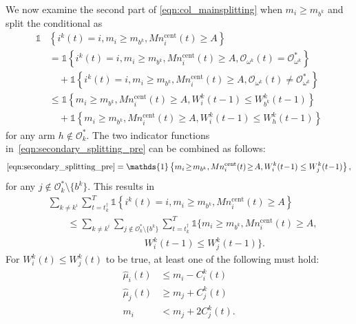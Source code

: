 \documentclass[final,5p,times,twocolumn]{elsarticle}
\theoremstyle{definition}
\begin{document}
	
	We now examine the second part of \eqref{eqn:col_mainsplitting} when $m_i \geq m_{b^k}$ and split the conditional as
	\begin{align}
		\mathds{1} &\left\{ i^k(t) \! = \! i, m_i \! \geq \! m_{b^k}, Mn_i^{\text{cent}}(t) \geq A \right\} \nonumber \\
		& = \mathds{1} \left\{ i^k(t) \! = \! i, m_i \! \geq \! m_{b^k}, Mn_i^{\text{cent}}(t) \! \geq \! A , \mathcal{O}_{\omega^k}(t) = \mathcal{O}_{\omega^k}^* \right\} \nonumber \\
		&\quad + \mathds{1} \left\{ i^k(t) \! = \! i, m_i \! \geq \! m_{b^k}, Mn_i^{\text{cent}}(t) \! \geq \! A , \mathcal{O}_{\omega^k}(t) \neq \mathcal{O}_{\omega^k}^* \right \} \nonumber \\
		&\leq \mathds{1} \left\{ m_i \! \geq \! m_{b^k}, Mn_i^{\text{cent}}(t) \! \geq \! A ,  W_i^k(t \! - \! 1) \leq W_{b^k}^k(t \! - \! 1) \right \} \nonumber \\
		&\quad + \mathds{1} \left\{ m_i \! \geq \! m_{b^k}, Mn_i^{\text{cent}}(t) \! \geq \! A , W_i^k(t \! - \! 1) \leq W_{h}^k(t \! - \! 1) \right \} \label{eqn:secondary_splitting_pre}
	\end{align}
	for any arm $h\notin \mathcal{O}_{k}^*$. The two indicator functions in~\eqref{eqn:secondary_splitting_pre} can be combined as follows:
		\begin{equation*}	
		\eqref{eqn:secondary_splitting_pre} = \mathds{1} \left\{ m_i \! \geq \! m_{b^k}, Mn_i^{\text{cent}}(t) \! \geq \! A , W_i^k(t \! - \! 1) \leq W_{j}^k(t \! - \! 1) \right \},
	\end{equation*}
	for any $j\notin \mathcal{O}_{k}^* \setminus \{b^k\}$.
%
	This results in 
%
	\begin{align}
		& \sum_{k \neq k^i} \sum_{t=t_k^\dag}^{T} \mathds{1} \left\{ i^k(t) = i, m_i \geq m_{b^k}, Mn_i^{\text{cent}}(t) \geq A \right\} \nonumber \\
		& \qquad \leq \sum_{k \neq k^i} \sum_{j\notin  \mathcal{O}_{k}^* \setminus \{ b^k\}} \sum_{t=t_k^\dag}^{T} \mathds{1} \big\{ m_i \! \geq \! m_{b^k}, Mn_i^{\text{cent}}(t) \! \geq \! A , \nonumber \\
		& \qquad \qquad \qquad \qquad \qquad   W_i^k(t \! - \! 1) \leq W_{j}^k(t \! - \! 1) \big \}. \label{eqn:Collisions_Selections_P2}
	\end{align}
%	
	 For $W_i^k(t) \leq W_{j}^k(t) $ to be true, at least one of the following must hold:
	\begin{align}
		\hat{\mu}_{i}(t) &\leq m_{i} - C_{i}^k(t) \label{1stcond_col2} \\
		\hat{\mu}_{j}(t) &\geq m_{j} + C_{j}^k(t) \label{2ndcond_col2} \\
		m_{i} &< m_{j} + 2 C_{j}^k(t). \label{3rdcond_col2} 
	\end{align}
\end{document}
